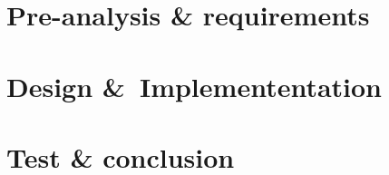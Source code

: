 %

\part{Pre-analysis \& requirements}\label{pt:preanalysis_req}
%

%

\graphicspath{{figures/technical/}}

















\part{Design \&\ Implemententation}\label{pt:design} 

%


\part{Test \& conclusion}\label{pt:test_conclusion}



